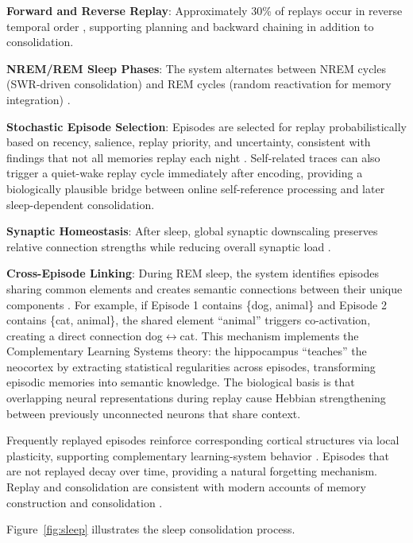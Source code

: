 \documentclass[11pt]{article}
\begin{document}
\textbf{Forward and Reverse Replay}: Approximately 30\% of replays occur in reverse temporal order
\citep{diba2007forward}, supporting planning and backward chaining in addition to consolidation.

\textbf{NREM/REM Sleep Phases}: The system alternates between NREM cycles (SWR-driven consolidation)
and REM cycles (random reactivation for memory integration) \citep{born2012system}.

\textbf{Stochastic Episode Selection}: Episodes are selected for replay probabilistically based on
recency, salience, replay priority, and uncertainty, consistent with findings that not all memories replay each night
\citep{wilson1994reactivation}.
Self-related traces can also trigger a quiet-wake replay cycle immediately after encoding, providing a biologically plausible bridge between online self-reference processing and later sleep-dependent consolidation.

\textbf{Synaptic Homeostasis}: After sleep, global synaptic downscaling preserves relative connection
strengths while reducing overall synaptic load \citep{tononi2006sleep}.

\textbf{Cross-Episode Linking}: During REM sleep, the system identifies episodes sharing common elements
and creates semantic connections between their unique components \citep{mcclelland1995there,kumaran2012inference}.
For example, if Episode 1 contains \{dog, animal\} and Episode 2 contains \{cat, animal\}, the shared
element ``animal'' triggers co-activation, creating a direct connection dog$\leftrightarrow$cat.
This mechanism implements the Complementary Learning Systems theory: the hippocampus ``teaches''
the neocortex by extracting statistical regularities across episodes, transforming episodic memories
into semantic knowledge. The biological basis is that overlapping neural representations during
replay cause Hebbian strengthening between previously unconnected neurons that share context.

Frequently replayed episodes reinforce corresponding cortical structures via local plasticity,
supporting complementary learning-system behavior \citep{mcclelland1995there}.
Episodes that are not replayed decay over time, providing a natural forgetting mechanism.
Replay and consolidation are consistent with modern accounts of memory construction and consolidation \citep{spens2024generative}.

Figure~\ref{fig:sleep} illustrates the sleep consolidation process.
\end{document}
